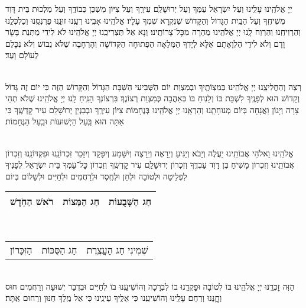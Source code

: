 \documentclass[twoside, openany, parskip=half, 11pt]{book}
\begin{document}
\begin{small}
יְיָ אֱלֹהֵֽינוּ עָלֵֽינוּ וְעַל יִשְׂרָאֵל עַמֶּךָ וְעַל יְרוּשָׁלַ‍ִם עִירֶֽךָ וְעַל צִיּוֹן מִשְׁכַּן כְּבוֹדֶֽךָ וְעַל מַלְכוּת בֵּית דָּוִד מְשִׁיחֶֽךָ וְעַל הַבַּֽיִת הַגָּדוֹל וְהַקָּדוֹשׁ שֶׁנִּקְרָא שִׁמְךָ עָלָיו׃ אֱלֹהֵֽינוּ אָבִֽינוּ רְעֵֽנוּ זוּנֵֽנוּ פַרְנְסֵֽנוּ וְכַלְכְּלֵֽנוּ וְהַרְוִיחֵֽנוּ וְהַרְוַח לָֽנוּ יְיָ אֱלֹהֵֽינוּ מְהֵרָה מִכׇּל־צָרוֹתֵֽינוּ׃ וְנָא אַל תַּצְרִיכֵֽנוּ יְיָ אֱלֹהֵֽינוּ לֹא לִידֵי מַתְּנַת בָּשָׂר וָדָם וְלֹא לִידֵי הַלְוָאָתָם אֶלָּא לְיָדְךָ הַמְּלֵאָה הַפְּתוּחָה הַקְּדוֹשָׁה וְהָרְחָבָה שֶׁלֹּא נֵבוֹשׁ וְלֹא נִכָּלֵם לְעוֹלָם וָעֶד׃

\enlargethispage{\baselineskip}

\vspace{-.25\baselineskip}
\begin{sometimes}

\shabbos\\
רְצֵה וְהַחֲלִיצֵֽנוּ יְיָ אֱלֹהֵֽינוּ בְּמִצְוֹתֶֽיךָ וּבְמִצְוַת יוֹם הַשְּׁבִיעִי הַשַּׁבָּת הַגָּדוֹל וְהַקָּדוֹשׁ הַזֶּה כִּי יוֹם זֶה גָּדוֹל וְקָדוֹשׁ הוּא לְפָנֶֽיךָ לִשְׁבָּת בּוֹ וְלָנֽוּחַ בּוֹ בְּאַהֲבָה כְּמִצְוַת רְצוֹנֶךָ׃ בִּרְצוֹנְךָ הָנִֽיחַ לָֽנוּ יְיָ אֱלֹהֵֽינוּ שֶׁלֹא תְהֵי צָרָה וְיָגוֹן וַאֲנָחָה בְּיוֹם מְנוּחָתֵֽנוּ וְהַרְאֵֽנוּ יְיָ אֱלֹהֵֽינוּ בְּנֶחָמוֹת צִיּוֹן עִירֶֽךָ וּבְבִנְיַן יְרוּשָׁלַ‍ִם עִיר קׇדְשֶֽׁךָ כִּי אַתָּה הוּא בַּֽעַל הַיְשׁוּעוֹת וּבַֽעַל הַנֶּחָמוֹת׃


\sepline %

\vspace{-.25\baselineskip}
\\
אֱלֹהֵֽינוּ וֵאלֹהֵי אֲבוֹתֵֽינוּ יַעֲלֶה וְיָבֹא וְיַגִּיעַ וְיֵרָאֶה וְיֵרָצֶה וְיִשָּׁמַע וְיִפָּקֵד וְיִזָּכֵר זִכְרוֹנֵֽנוּ וּפִקְדּוֹנֵֽנוּ וְזִכְרוֹן אֲבוֹתֵֽינוּ וְזִכְרוֹן מָשִׁיחַ בֶּן דָּוִד עַבְדֶּֽךָ וְזִכְרוֹן יְרוּשָׁלַ‍ִם עִיר קׇדְשֶֽׁךָ וְזִכְרוֹן כׇּל־עַמְּךָ בֵּית יִשְׂרָאֵל לְפָנֶיךָ לִפְלֵיטָה וּלְטוֹבָה וּלְחֵן וּלְחֶֽסֶד וּלְרַחֲמִים וּלְחַיִּים וּלְשָׁלוֹם בְּיוֹם\\
\begin{tabular}{c|c|c}
רֹאשׁ הַחֹֽדֶשׁ & חַג הַמַּצוֹת & חַג הַשָּׁבֻעוֹת\\ \hline
\end{tabular}\\
\begin{tabular}{c|c|c}
הַזִּכָּרוֹן & חַג הַסֻּכּוֹת & שְׁמִינִי חַג הָעֲצֶֽרֶת
\end{tabular}\\
הַזֶּה זׇכְרֵֽנּוּ יְיָ אֱלֹהֵֽינוּ בּוֹ לְטוֹבָה וּפׇקְדֵֽנוּ בוֹ לִבְרָכָה וְהוֹשִׁיעֵֽנוּ בוֹ לְחַיִּים וּבִדְבַר יְשׁוּעָה וְרַחֲמִים חוּס וְחׇׇׇׇנֵּנוּ וְרַחֵם עָלֵֽינוּ וְהוֹשִׁיעֵֽנוּ כִּי אֵלֶֽיךָ עֵינֵֽינוּ כִּי אֵל מֶֽלֶךְ חַנּוּן וְרַחוּם אַֽתָּה׃


\end{sometimes}
\end{small}
\end{document}
